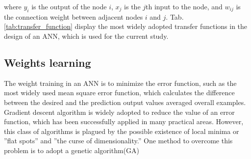 where $y_i$ is the output of the node $i$, $x_j$ is the $j$th input to the
node, and $w_{ij}$ is the connection weight between adjacent nodes $i$ and $j$.
Tab. \ref{tab:transfer_function} display the most widely adopted transfer
functions in the design of an ANN, which is used for the current study.



\subsection{Weights learning}
The weight training in an ANN is to minimize the error function, such as the
most widely used mean square error function, which calculates the difference
between the desired and the prediction output values averaged overall examples.
Gradient descent algorithm is widely adopted to reduce the value of an error
function, which has been successfully applied in many practical areas. However,
this class of algorithms is plagued by the possible existence of local minima
or ”flat spots” and ”the curse of dimensionality.” One method to overcome this
problem is to adopt a genetic algorithm(GA)

